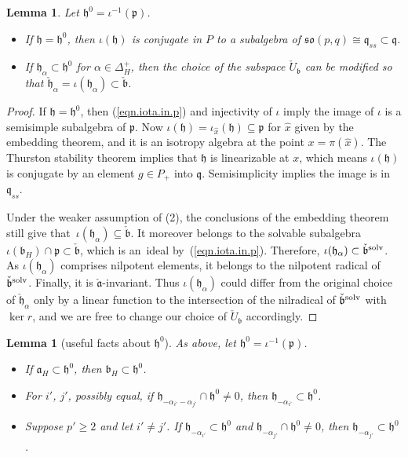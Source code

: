 \documentclass[10pt,a4paper]{amsart}
\numberwithin{equation}{section}
\newtheorem{lem}[thm]{Lemma}
\theoremstyle{definition}
\newcommand{\lieh}{\mathfrak{h}}
\def\p{{\mathfrak p}}
\def\q{{\mathfrak q}}
\def\a{{\mathfrak a}}
\def\b{{\mathfrak b}}
\newcommand{\so}{\mathfrak{so}}
\begin{document}
\begin{lem}\label{lem.lots.in.h0}
Let $\lieh^0 = \iota^{-1}(\p)$.
\begin{itemize}\itemsep=0pt
\item[$(1)$] If $\lieh = \lieh^0$, then $\iota(\lieh)$ is conjugate in $P$ to a subalgebra of $\so(p,q) \cong \q_{ss} \subset \q$.
\item[$(2)$] If $\lieh_\alpha \subset \lieh^0$ for $\alpha \in \Delta^+_H$, then the choice of the subspace $\check{U}_\b$ can be modified so that ${\check{\lieh}_\alpha = \iota(\lieh_\alpha) \subset \check{\b}}$.
\end{itemize}
\end{lem}

\begin{proof}
If $\lieh=\lieh^0$, then (\ref{eqn.iota.in.p}) and injectivity of $\iota$ imply the image of $\iota$ is a semisimple subalgebra of $\p$. Now $\iota(\lieh) = \iota_{\hat{x}}(\lieh) \subseteq \p$ for $\hat{x}$ given by the embedding theorem, and it is an isotropy algebra at the point $x = \pi(\hat{x})$.
The Thurston stability theorem \cite[Theorem~3]{thurston.reeb.stability} implies that $\lieh$ is linearizable at $x$, which means $\iota(\lieh)$ is conjugate by an element $g \in P_+$ into $\q$.
Semisimplicity implies the image is in $\q_{ss}$.

 Under the weaker assumption of (2), the conclusions of the embedding theorem still give that~$\iota(\lieh_\alpha) \subseteq \check{\b}$. It moreover belongs to the solvable subalgebra $\iota(\b_H) \cap \p \subset \check{\b}$, which is an~ideal by~(\ref{eqn.iota.in.p}). Therefore, $\iota(\lieh_\alpha) \subset \check{\b}^{\rm solv}$. As $\iota(\lieh_\alpha)$ comprises nilpotent elements, it belongs to the nilpotent radical of $\check{\b}^{\rm solv}$. Finally, it is $\check{\a}$-invariant. Thus $\iota(\lieh_\alpha)$ could differ from the original choice of $\check{\lieh}_\alpha$ only by a linear function to the intersection of the nilradical of $\check{\b}^{\rm solv}$ with $\ker r$, and we are free to change our choice of $\check{U}_{\b}$ accordingly.
\end{proof}

\begin{lem}[useful facts about $\lieh^0$]
\label{lem.about.h0}
As above, let $\lieh^0 = \iota^{-1}(\p)$.
\begin{itemize}\itemsep=0pt
\item[$(1)$] If $\a_H \subset \lieh^0$, then $\b_H \subset \lieh^0$.
\item[$(2)$] For $i'$, $j'$, possibly equal, if $\lieh_{- \alpha_{i'} - \alpha_{j'}} \cap \lieh^0 \neq 0$, then $\lieh_{- \alpha_{i'}} \subset \lieh^0$.
\item[$(3)$] Suppose $p' \geq 2$ and let $i' \neq j'$. If $\lieh_{-\alpha_{i'}} \subset \lieh^0$ and $\lieh_{- \alpha_{j'}} \cap \lieh^0 \neq 0$, then $\lieh_{-\alpha_{j'}} \subset \lieh^0$.
\end{itemize}
\end{lem}
\end{document}
